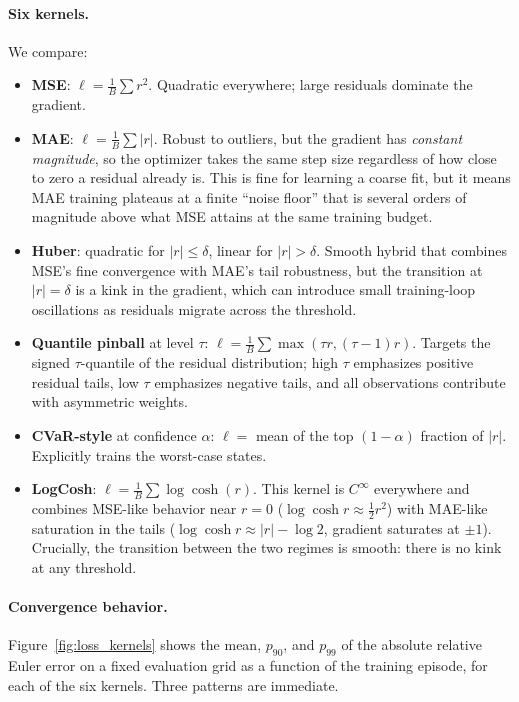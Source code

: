 \documentclass[11pt,a4paper]{report}
\begin{document}
\paragraph{Six kernels.}  We compare:

\begin{itemize}[itemsep=2pt]
\item \textbf{MSE}: $\ell = \tfrac1B \sum r^2$.  Quadratic everywhere; large residuals dominate the gradient.
\item \textbf{MAE}: $\ell = \tfrac1B \sum |r|$.  Robust to outliers, but the gradient has \emph{constant magnitude}, so the optimizer takes the same step size regardless of how close to zero a residual already is.  This is fine for learning a coarse fit, but it means MAE training plateaus at a finite ``noise floor'' that is several orders of magnitude above what MSE attains at the same training budget.
\item \textbf{Huber}: quadratic for $|r| \le \delta$, linear for $|r| > \delta$.  Smooth hybrid that combines MSE's fine convergence with MAE's tail robustness, but the transition at $|r|=\delta$ is a kink in the gradient, which can introduce small training-loop oscillations as residuals migrate across the threshold.
\item \textbf{Quantile pinball} at level $\tau$: $\ell = \tfrac1B \sum \max(\tau r, (\tau-1)r)$.  Targets the signed $\tau$-quantile of the residual distribution; high $\tau$ emphasizes positive residual tails, low $\tau$ emphasizes negative tails, and all observations contribute with asymmetric weights.
\item \textbf{CVaR-style} at confidence $\alpha$: $\ell = $ mean of the top $(1{-}\alpha)$ fraction of $|r|$.  Explicitly trains the worst-case states.
\item \textbf{LogCosh}: $\ell = \tfrac1B \sum \log\cosh(r)$.  This kernel is $C^\infty$ everywhere and combines MSE-like behavior near $r=0$ ($\log\cosh r \approx \tfrac12 r^2$) with MAE-like saturation in the tails ($\log\cosh r \approx |r| - \log 2$, gradient saturates at $\pm 1$).  Crucially, the transition between the two regimes is smooth: there is no kink at any threshold.
\end{itemize}

\paragraph{Convergence behavior.}  Figure~\ref{fig:loss_kernels} shows the mean, $p_{90}$, and $p_{99}$ of the absolute relative Euler error on a fixed evaluation grid as a function of the training episode, for each of the six kernels.  Three patterns are immediate.
\end{document}
